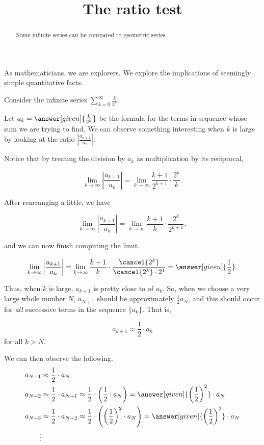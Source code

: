 \documentclass{ximera}
\title[Dig-In:]{The ratio test}
\begin{document}
\begin{abstract}
Some infinite series can be compared to geometric series.
\end{abstract}
\maketitle

As mathematicians, we are explorers. We explore the implications of
seemingly simple quantitative facts. 

\begin{exploration}
Consider the infinite series $\sum_{k=0}^\infty \frac{k}{2^k}$. 

Let $a_k = \answer[given]{\frac{k}{2^k}}$ be the formula for the terms in sequence whose sum we are trying to find.  We can observe something interesting when $k$ is large by looking at the ratio $\left|\frac{a_{n+1}}{a_n}\right|$.

Notice that by treating the division by $a_k$ as multiplication by its reciprocal, 

\[
\lim_{k \to \infty} \left|\frac{a_{k+1}}{a_k}\right| = \lim_{k \to \infty} \frac{k+1}{2^{k+1}} \cdot \frac{2^k}{k}.
\]

After rearranging a little, we have

\[
\lim_{k \to \infty} \left|\frac{a_{k+1}}{a_k}\right| = \lim_{k \to \infty} \frac{k+1}{k} \cdot \frac{2^k}{2^{k+1}},
\]

and we can now finish computing the limit.

\[
\lim_{k \to \infty} \left|\frac{a_{k+1}}{a_k}\right| = \lim_{k \to \infty} \frac{k+1}{k} \cdot \frac{\cancel{2^k}}{\cancel{2^k} \cdot 2^1} = \answer[given]{\frac{1}{2}}.
\]

Thus, when $k$ is large, $a_{k+1}$ is pretty close to
 of $a_{k}$.  
So, when we choose a very large whole number $N$, $a_{N+1}$ should be approximately $\frac{1}{2} a_N$, and this should occur for \emph{all} successive terms in the sequence $\{a_k\}$.  That is, 

\[
a_{k+1} \approx  \frac{1}{2} \cdot a_k
\]
for all $k>N$.

We can then observe the following.
\begin{align*}
  a_{N+1} &\approx  \frac{1}{2} \cdot a_N \\
  a_{N+2} &\approx  \frac{1}{2} \cdot a_{N+1}  \approx \frac{1}{2} \cdot \left(\frac{1}{2} \cdot a_N\right) = \answer[given]{\left(\frac{1}{2}\right)^2} \cdot a_N \\
  a_{N+3} &\approx  \frac{1}{2} \cdot a_{N+2}  \approx \frac{1}{2} \cdot \left( \left(\frac{1}{2}\right)^2 \cdot a_N\right) = \answer[given]{\left(\frac{1}{2}\right)^3} \cdot a_N \\
\vdots
\end{align*}


\end{exploration}
\end{document}
